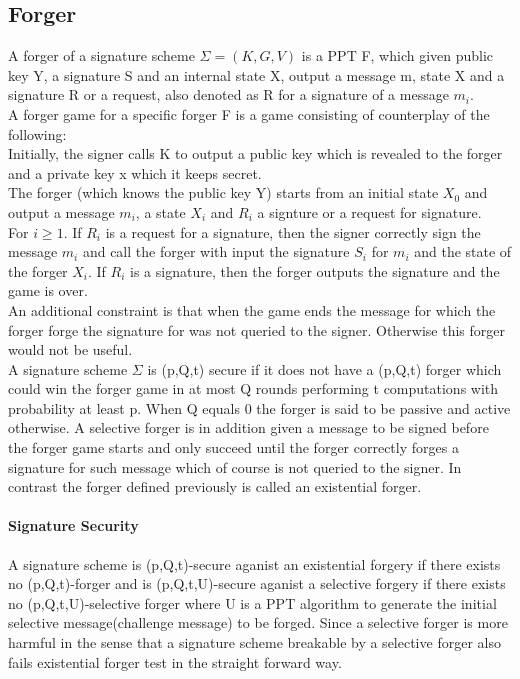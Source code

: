 \documentclass[12]{article}
\begin{document}
\subsection{Forger}
A forger of a signature scheme $\Sigma=(K,G,V)$ is a PPT F, which given public key Y, a signature S and an internal state X, output a message m, state X and a signature R or a request, also denoted as R for a signature of a message $m_i$. \\

A forger game for a specific forger F is a game consisting of counterplay of the following:\\
Initially, the signer calls K to output a public key which is revealed to the forger and a private key x which it keeps secret.\\
The forger (which knows the public key Y) starts from an initial state $X_0$ and output a message $m_i$, a state $X_i$ and $R_i$ a signture or a request for signature.\\
For $i \ge 1$. If $R_i$ is a request for a signature, then the signer correctly sign the message $m_i$ and call the forger with input the signature $S_i$ for $m_i$ and the state of the forger $X_i$. If $R_i$ is a signature, then the forger outputs the signature and the game is over.\\
An additional constraint is that when the game ends the message for which the forger forge the signature for was not queried to the signer. Otherwise this forger would not be useful. \\
A signature scheme $\Sigma$ is (p,Q,t) secure if it does not have a (p,Q,t) forger which could win the forger game in at most Q rounds performing t computations with probability at least p. When Q equals 0 the forger is said to be passive and active otherwise. A selective forger is in addition given a message to be signed before the forger game starts and only succeed until the forger correctly forges a signature for such message which of course is not queried to the signer. In contrast the forger defined previously is called an existential forger.\\
\paragraph{Signature Security} A signature scheme is (p,Q,t)-secure aganist an existential forgery if there exists no (p,Q,t)-forger and is (p,Q,t,U)-secure aganist a selective forgery if there exists no (p,Q,t,U)-selective forger where U is a PPT algorithm to generate the initial selective message(challenge message) to be forged. Since a selective forger is more harmful in the sense that a signature scheme breakable by a selective forger also fails existential forger test in the straight forward way.
\end{document}

